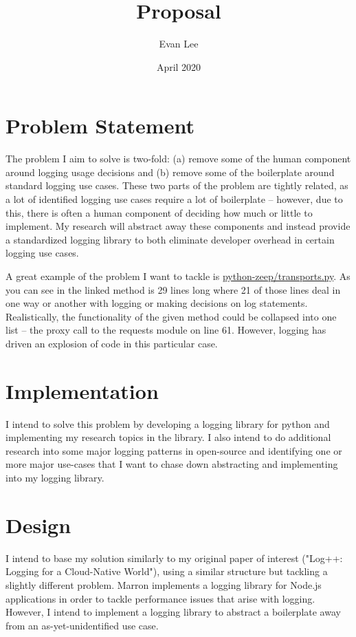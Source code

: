\documentclass{article}
\title{Proposal}
\author{Evan Lee }
\date{April 2020}
\begin{document}
\maketitle

\section{Problem Statement} The problem I aim to solve is two-fold: (a) remove some of the human component around logging usage decisions and (b) remove some of the boilerplate around standard logging use cases. These two parts of the problem are tightly related, as a lot of identified logging use cases require a lot of boilerplate -- however, due to this, there is often a human component of deciding how much or little to implement. My research will abstract away these components and instead provide a standardized logging library to both eliminate developer overhead in certain logging use cases.
            
A great example of the problem I want to tackle is \href{https://github.com/mvantellingen/python-zeep/blob/4df383021e31372c111bc26cbf2e4535deaee04e/src/zeep/transports.py\#L47}{python-zeep/transports.py}. As you can see in the linked method is 29 lines long where 21 of those lines deal in one way or another with logging or making decisions on log statements. Realistically, the functionality of the given method could be collapsed into one list -- the proxy call to the requests module on line 61. However, logging has driven an explosion of code in this particular case. 


\section{Implementation} I intend to solve this problem by developing a logging library for python and implementing my research topics in the library. I also intend to do additional research into some major logging patterns in open-source and identifying one or more major use-cases that I want to chase down abstracting and implementing into my logging library. 

\section{Design} I intend to base my solution similarly to my original paper of interest ("Log++: Logging for a Cloud-Native World"), using a similar structure but tackling a slightly different problem. Marron implements a logging library for Node.js applications in order to tackle performance issues that arise with logging. However, I intend to implement a logging library to abstract a boilerplate away from an as-yet-unidentified use case. 
 
\end{document}
